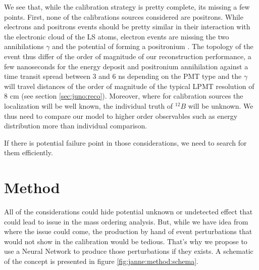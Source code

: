 \documentclass[../main.tex]{subfiles}
\begin{document}
We see that, while the calibration strategy is pretty complete, its missing a few points. First, none of the calibrations sources considered are positrons. While electrons and positrons events should be pretty similar in their interaction with the electronic cloud of the LS atoms, electron events are missing the two annihilations $\gamma$ and the potential of forming a positronium \cite{schwarz_measurements_2018}. The topology of the event thus differ of the order of magnitude of our reconstruction performance, a few nanoseconds for the energy deposit and positronium annihilation against a time transit spread between 3 and 6 ns depending on the PMT type \cite{rodphai_20-inch_2021, liao_study_2017, li_characterization_2018} and the $\gamma$ will travel distances of the order of magnitude of the typical LPMT resolution of 8 cm (see section \ref{sec:juno:reco}). Moreover, where for calibration sources the localization will be well known, the individual truth of $^{12}B$ will be unknown. We thus need to compare our model to higher order observables such as energy distribution more than individual comparison.

If there is potential failure point in those considerations, we need to search for them efficiently.

\section{Method}
\label{sec:janne:method}

All of the considerations could hide potential unknown or undetected effect that could lead to issue in the mass ordering analysis. But, while we have idea from where the issue could come, the production by hand of event perturbations that would not show in the calibration would be tedious. That's why we propose to use a Neural Network to produce those perturbations if they exists. A schematic of the concept is presented in figure \ref{fig:janne:method:schema}.
\end{document}
